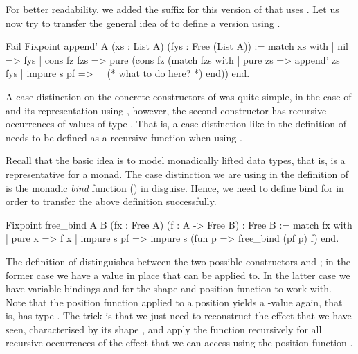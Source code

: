 For better readability, we added the suffix  for this version of  that uses .
Let us now try to transfer the general idea of  to define a version using .

\begin{coqcode}
Fail Fixpoint append' A (xs : List A) (fys : Free (List A)) :=
 match xs with
 | nil         => fys
 | cons fz fzs => pure (cons fz (match fzs with
                          | pure zs     => append' zs fys
                          | impure s pf => _ (* what to do here? *)
                          end))
 end.
\end{coqcode}

A case distinction on the concrete constructors of  was quite simple, in the case of  and its representation using , however, the second constructor  has recursive occurrences of values of type .
That is, a case distinction like in the definition of  needs to be defined as a recursive function when using .

Recall that the basic idea is to model monadically lifted data types, that is,  is a representative for a monad.
The case distinction we are using in the definition of  is the monadic \emph{bind} function (\cinl{(>>=)}) in disguise.
Hence, we need to define bind for  in order to transfer the above definition successfully.

\begin{coqcode}
Fixpoint free_bind A B (fx : Free A) (f : A -> Free B) : Free B :=
 match fx with
 | pure x      => f x
 | impure s pf => impure s (fun p => free_bind (pf p) f)
 end.
\end{coqcode}

The definition of  distinguishes between the two possible constructors  and ; in the former case we have a value  in place that  can be applied to.
In the latter case we have variable bindings  and  for the shape and position function to work with.
Note that the position function applied to a position yields a \--value again, that is,  has type
.
The trick is that we just need to reconstruct the effect that we have seen, characterised by its shape , and apply the function  recursively for all recursive occurrences of the effect that we can access using the position function .

